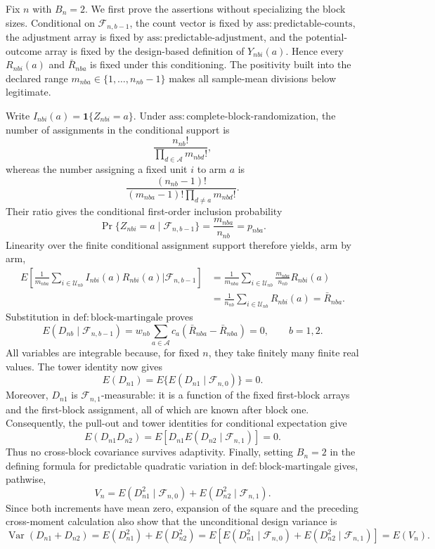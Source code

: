 Fix \(n\) with \(B_n=2\).  We first prove the assertions without specializing the block sizes.  Conditional on \(\mathcal F_{n,b-1}\), the count vector is fixed by \(\mathrm{ass{:}predictable\text{-}counts}\), the adjustment array is fixed by \(\mathrm{ass{:}predictable\text{-}adjustment}\), and the potential-outcome array is fixed by the design-based definition of \(Y_{nbi}(a)\).  Hence every \(R_{nbi}(a)\) and \(\bar R_{nba}\) is fixed under this conditioning.  The positivity built into the declared range \(m_{nba}\in\{1,\ldots,n_{nb}-1\}\) makes all sample-mean divisions below legitimate.

Write \(I_{nbi}(a)=\mathbf 1\{Z_{nbi}=a\}\).  Under \(\mathrm{ass{:}complete\text{-}block\text{-}randomization}\), the number of assignments in the conditional support is
\[
 \frac{n_{nb}!}{\prod_{d\in\mathcal A}m_{nbd}!},
\]
whereas the number assigning a fixed unit \(i\) to arm \(a\) is
\[
 \frac{(n_{nb}-1)!}{(m_{nba}-1)!\prod_{d\ne a}m_{nbd}!}.
\]
Their ratio gives the conditional first-order inclusion probability
\[
 \Pr\{Z_{nbi}=a\mid\mathcal F_{n,b-1}\}=\frac{m_{nba}}{n_{nb}}=p_{nba}.
\]
Linearity over the finite conditional assignment support therefore yields, arm by arm,
\[
 \begin{aligned}
 E\!\left[
   \frac1{m_{nba}}\sum_{i\in\mathcal U_{nb}}I_{nbi}(a)R_{nbi}(a)
   \mathrel{\Big|}\mathcal F_{n,b-1}
 \right]
 &=\frac1{m_{nba}}\sum_{i\in\mathcal U_{nb}}
   \frac{m_{nba}}{n_{nb}}R_{nbi}(a)\\
 &=\frac1{n_{nb}}\sum_{i\in\mathcal U_{nb}}R_{nbi}(a)
 =\bar R_{nba}.
 \end{aligned}
\]
Substitution in \(\mathrm{def{:}block\text{-}martingale}\) proves
\[
 E(D_{nb}\mid\mathcal F_{n,b-1})
 =w_{nb}\sum_{a\in\mathcal A}c_a(\bar R_{nba}-\bar R_{nba})=0,
 \qquad b=1,2.
\]
All variables are integrable because, for fixed \(n\), they take finitely many finite real values.  The tower identity now gives
\[
 E(D_{n1})=E\{E(D_{n1}\mid\mathcal F_{n,0})\}=0.
\]
Moreover, \(D_{n1}\) is \(\mathcal F_{n,1}\)-measurable: it is a function of the fixed first-block arrays and the first-block assignment, all of which are known after block one.  Consequently, the pull-out and tower identities for conditional expectation give
\[
 E(D_{n1}D_{n2})
 =E\!\left[D_{n1}E(D_{n2}\mid\mathcal F_{n,1})\right]=0.
\]
Thus no cross-block covariance survives adaptivity.  Finally, setting \(B_n=2\) in the defining formula for predictable quadratic variation in \(\mathrm{def{:}block\text{-}martingale}\) gives, pathwise,
\[
 V_n=E(D_{n1}^2\mid\mathcal F_{n,0})
     +E(D_{n2}^2\mid\mathcal F_{n,1}).
\]
Since both increments have mean zero, expansion of the square and the preceding cross-moment calculation also show that the unconditional design variance is
\[
 \operatorname{Var}(D_{n1}+D_{n2})
 =E(D_{n1}^2)+E(D_{n2}^2)
 =E\!\left[E(D_{n1}^2\mid\mathcal F_{n,0})
             +E(D_{n2}^2\mid\mathcal F_{n,1})\right]
 =E(V_n).
\]

